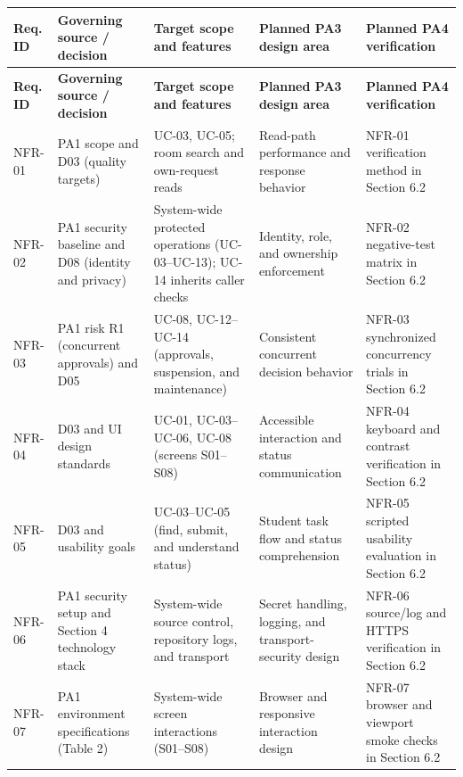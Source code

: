 \begingroup
\footnotesize
{}
\setlength{\tabcolsep}{2pt}
\renewcommand{\arraystretch}{1.1}
\begin{longtable}{|>{\raggedright\arraybackslash}p{}|>{\raggedright\arraybackslash}p{}|>{\raggedright\arraybackslash}p{}|>{\raggedright\arraybackslash}p{}|>{\raggedright\arraybackslash}p{}|}
\hline
\textbf{Req. ID} & \textbf{Governing source / decision} & \textbf{Target scope and features} & \textbf{Planned PA3 design area} & \textbf{Planned PA4 verification} \\ \hline
\endfirsthead
\hline
\textbf{Req. ID} & \textbf{Governing source / decision} & \textbf{Target scope and features} & \textbf{Planned PA3 design area} & \textbf{Planned PA4 verification} \\ \hline
\endhead
\hline
\endfoot
\hline
\endlastfoot
NFR-01 & PA1 scope and D03 (quality targets) & UC-03, UC-05; room search and own-request reads & Read-path performance and response behavior & NFR-01 verification method in Section 6.2 \\ \hline
NFR-02 & PA1 security baseline and D08 (identity and privacy) & System-wide protected operations (UC-03--UC-13); UC-14 inherits caller checks & Identity, role, and ownership enforcement & NFR-02 negative-test matrix in Section 6.2 \\ \hline
NFR-03 & PA1 risk R1 (concurrent approvals) and D05 & UC-08, UC-12--UC-14 (approvals, suspension, and maintenance) & Consistent concurrent decision behavior & NFR-03 synchronized concurrency trials in Section 6.2 \\ \hline
NFR-04 & D03 and UI design standards & UC-01, UC-03--UC-06, UC-08 (screens S01--S08) & Accessible interaction and status communication & NFR-04 keyboard and contrast verification in Section 6.2 \\ \hline
NFR-05 & D03 and usability goals & UC-03--UC-05 (find, submit, and understand status) & Student task flow and status comprehension & NFR-05 scripted usability evaluation in Section 6.2 \\ \hline
NFR-06 & PA1 security setup and Section 4 technology stack & System-wide source control, repository logs, and transport & Secret handling, logging, and transport-security design & NFR-06 source/log and HTTPS verification in Section 6.2 \\ \hline
NFR-07 & PA1 environment specifications (Table 2) & System-wide screen interactions (S01--S08) & Browser and responsive interaction design & NFR-07 browser and viewport smoke checks in Section 6.2 \\ \hline

\end{longtable}
